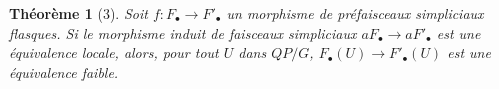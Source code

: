 \documentclass[11pt]{article}
\theoremstyle{deligne}
\newtheorem*{theorem*}{Théorème}
\begin{document}
\begin{theorem*}[3]
Soit \(f:F_\bullet\to F'_\bullet\) un morphisme de préfaisceaux simpliciaux flasques. Si le morphisme induit de faisceaux simpliciaux \(aF_\bullet\to aF'_\bullet\) est une équivalence locale, alors, pour tout \(U\) dans \(QP/G\), \(F_\bullet(U)\to F'_\bullet(U)\) est une équivalence faible.
\end{theorem*}
\end{document}
